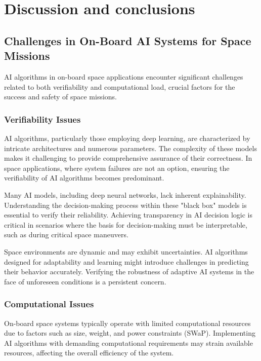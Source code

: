 
\chapter{Discussion and conclusions}
\label{Chapter6}
    
\section{Challenges in On-Board AI Systems for Space Missions}

AI algorithms in on-board space applications encounter significant challenges related to both verifiability and computational load, crucial factors for the success and safety of space missions.

\subsection{Verifiability Issues}
AI algorithms, particularly those employing deep learning, are characterized by intricate architectures and numerous parameters. The complexity of these models makes it challenging to provide comprehensive assurance of their correctness. In space applications, where system failures are not an option, ensuring the verifiability of AI algorithms becomes predominant.

Many AI models, including deep neural networks, lack inherent explainability. Understanding the decision-making process within these "black box" models is essential to verify their reliability. Achieving transparency in AI decision logic is critical in scenarios where the basis for decision-making must be interpretable, such as during critical space maneuvers.

Space environments are dynamic and may exhibit uncertainties. AI algorithms designed for adaptability and learning might introduce challenges in predicting their behavior accurately. Verifying the robustness of adaptive AI systems in the face of unforeseen conditions is a persistent concern.

\subsection{Computational Issues}
On-board space systems typically operate with limited computational resources due to factors such as size, weight, and power constraints (SWaP). Implementing AI algorithms with demanding computational requirements may strain available resources, affecting the overall efficiency of the system.

